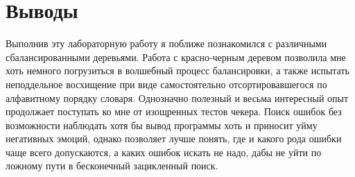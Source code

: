 \section{Выводы}

Выполнив эту лабораторную работу я поближе познакомился с различными сбалансированными деревьями. 
Работа с красно-черным деревом позволила мне хоть немного погрузиться в волшебный процесс балансировки, а также испытать неподдельное
восхищение при виде самостоятельно отсортировавшегося по алфавитному порядку
словаря. Однозначно полезный и весьма интересный опыт продолжает поступать ко
мне от изощренных тестов чекера. Поиск ошибок без возможности наблюдать хотя
бы вывод программы хоть и приносит уйму негативных эмоций, однако позволяет
лучше понять, где и какого рода ошибки чаще всего допускаются, а каких ошибок
искать не надо, дабы не уйти по ложному пути в бесконечный зацикленный поиск.
\pagebreak
